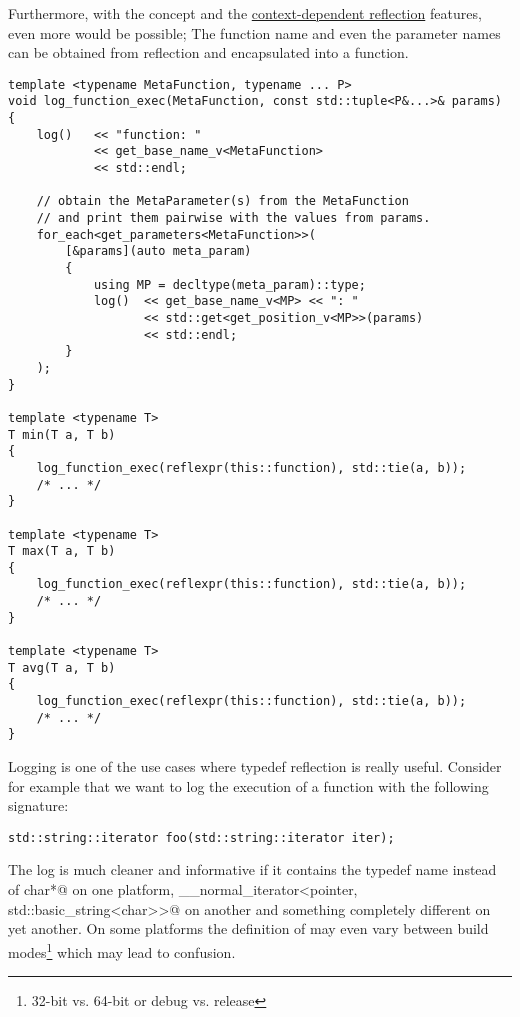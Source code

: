 Furthermore, with the  concept and the
\hyperref[context-dependent-reflection]{context-dependent reflection} features,
even more would be possible; The function name and even the parameter names can
be obtained from reflection and encapsulated into a function.

\begin{verbatim}
template <typename MetaFunction, typename ... P>
void log_function_exec(MetaFunction, const std::tuple<P&...>& params)
{
	log()   << "function: "
	        << get_base_name_v<MetaFunction>
	        << std::endl;

	// obtain the MetaParameter(s) from the MetaFunction
	// and print them pairwise with the values from params.
	for_each<get_parameters<MetaFunction>>(
		[&params](auto meta_param)
		{
			using MP = decltype(meta_param)::type;
			log()  << get_base_name_v<MP> << ": "
			       << std::get<get_position_v<MP>>(params)
			       << std::endl;
		}
	);
}

template <typename T>
T min(T a, T b)
{
	log_function_exec(reflexpr(this::function), std::tie(a, b));
	/* ... */
}

template <typename T>
T max(T a, T b)
{
	log_function_exec(reflexpr(this::function), std::tie(a, b));
	/* ... */
}

template <typename T>
T avg(T a, T b)
{
	log_function_exec(reflexpr(this::function), std::tie(a, b));
	/* ... */
}
\end{verbatim}

Logging is one of the use cases where typedef reflection is really useful.
Consider for example that we want to log the execution of a function with
the following signature:

\begin{verbatim}
std::string::iterator foo(std::string::iterator iter);
\end{verbatim}

The log is much cleaner and informative if it contains the typedef name
\verb@iterator@ instead of \verb@const char*@ on one platform,
\verb@__normal_iterator<pointer, std::basic_string<char>>@ on another and
something completely different on yet another. On some platforms the definition
of \verb@iterator@ may even vary between build modes\footnote{32-bit vs. 64-bit or 
debug vs. release} which may lead to confusion.
